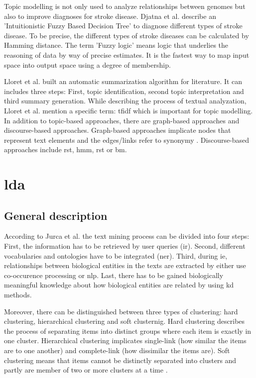 Topic modelling is not only used to analyze relationships between genomes but also to improve diagnoses for stroke disease. Djatna et al. \autocite{djatna_2018} describe an 'Intuitionistic Fuzzy Based Decision Tree' to diagnose different types of stroke disease. To be precise, the different types of stroke diseases can be calculated by Hamming distance. The term 'Fuzzy logic' means logic that underlies the reasoning of data by way of precise estimates. It is the fastest way to map input space into output space using a degree of membership.

Lloret et al. \autocite{lloret_2012} built an automatic summarization algorithm for literature. It can includes three steps: First, topic identification, second topic interpretation and third summary generation. While describing the process of textual analyzation, Lloret et al. mention a specific term: \gls{tfidf} which is important for topic modelling. In addition to topic-based approaches, there are graph-based approaches and discourse-based approaches. Graph-based approaches implicate nodes that represent text elements and the edges/links refer to synonymy \autocite{lloret_2012}. Discourse-based approaches include \gls{rst}, \gls{hmm}, \gls{rst} or \gls{bm}. 
 
\chapter{\gls{lda}}\label{lda}
\section{General description}\label{lda_description}
According to Jurca et al. \autocite{jurca_2016} the text mining process can be divided into four steps: First, the information has to be retrieved by user queries (\gls{ir}). Second, different vocabularies and ontologies have to be integrated (\gls{ner}). Third, during \gls{ie}, relationships between biological entities in the texts are extracted by either use co-occurence processing or \gls{nlp}. Last, there has to be gained biologically meaningful knowledge about how biological entities are related by using \gls{kd} methods.

Moreover, there can be distinguished between three types of clustering: hard clustering, hierarchical clustering and soft clusternig. Hard clustering describes the process of separating items into distinct groups where each item is exactly in one cluster. Hierarchical clustering implicates single-link (how similar the items are to one another) and complete-link (how dissimilar the items are). Soft clustering means that items cannot be distinctly separated into clusters and partly are member of two or more clusters at a time \autocite{jurca_2016}.  

